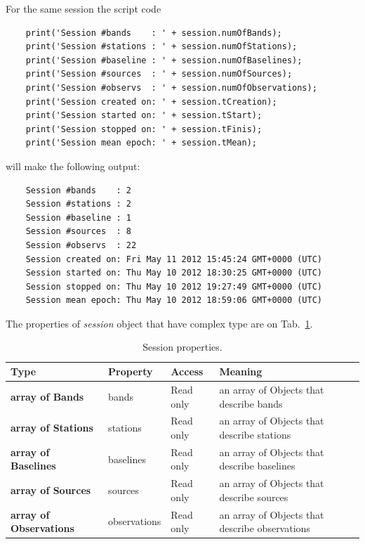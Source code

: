 \documentclass [10pt,letterpaper]{report}
\begin{document}
\noindent
For the same session the script code
{\small\begin{verbatim}
    print('Session #bands    : ' + session.numOfBands);
    print('Session #stations : ' + session.numOfStations);
    print('Session #baseline : ' + session.numOfBaselines);
    print('Session #sources  : ' + session.numOfSources);
    print('Session #observs  : ' + session.numOfObservations);
    print('Session created on: ' + session.tCreation);
    print('Session started on: ' + session.tStart);
    print('Session stopped on: ' + session.tFinis);
    print('Session mean epoch: ' + session.tMean);
\end{verbatim}}
\noindent
will make the following output:
{\small\begin{verbatim}
    Session #bands    : 2
    Session #stations : 2
    Session #baseline : 1
    Session #sources  : 8
    Session #observs  : 22
    Session created on: Fri May 11 2012 15:45:24 GMT+0000 (UTC)
    Session started on: Thu May 10 2012 18:30:25 GMT+0000 (UTC)
    Session stopped on: Thu May 10 2012 19:27:49 GMT+0000 (UTC)
    Session mean epoch: Thu May 10 2012 18:59:06 GMT+0000 (UTC)
\end{verbatim}}

The properties of {\sl session} object that have complex type are on Tab.~\ref{tab-scr-session-3}.

\begin{table}[htb]
\centering
\footnotesize
\begin{tabular}{lllp{}}
\hline
Type & Property & Access & Meaning\\
\hline
  {\bf array of Bands}        & bands           & Read only & an array of Objects that describe bands\\
  {\bf array of Stations}     & stations        & Read only & an array of Objects that describe stations\\
  {\bf array of Baselines}    & baselines       & Read only & an array of Objects that describe baselines\\
  {\bf array of Sources}      & sources         & Read only & an array of Objects that describe sources\\
  {\bf array of Observations} & observations    & Read only & an array of Objects that describe observations\\
\hline
\end{tabular}
\caption{Session properties.}
\label{tab-scr-session-3}
\end{table}
\end{document}

